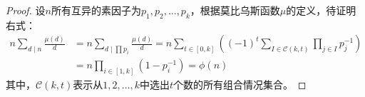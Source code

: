 \begin{proof}
    设$n$所有互异的素因子为$p_1,p_2,\ldots,p_k$，根据莫比乌斯函数$\mu$的定义，待证明右式：
    \begin{align*}
        n\sum_{d\mid n}\frac{\mu(d)}{d} &= n\sum_{d\mid \prod p_i}\frac{\mu(d)}{d} 
        =n \sum_{t\in [0,k]} \left((-1)^t \sum_{I\in \mathcal{C}(k,t)} \prod_{j\in I} p_j^{-1}\right)\\
        &= n \prod_{i\in [1,k]}\left( 1 - p_i^{-1}\right) = \phi(n)
    \end{align*}
    其中，$\mathcal{C}(k,t)$表示从$1,2,\ldots,k$中选出$t$个数的所有组合情况集合。
\end{proof}
